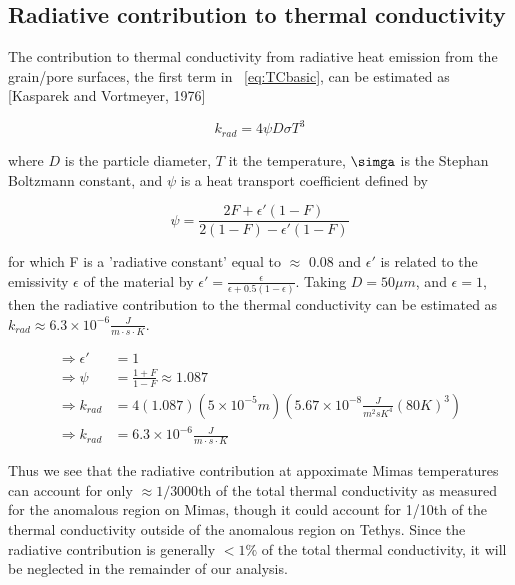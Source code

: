 \documentclass[11pt]{article} %
\begin{document}
\subsection{Radiative contribution to thermal conductivity}
\label{sec:krad}

	The contribution to thermal conductivity from radiative heat emission from the grain/pore surfaces, the first term in ~\ref{eq:TCbasic}, can be estimated as [Kasparek and Vortmeyer, 1976]

	\begin{equation}
	k_{rad} = 4 \psi D \sigma T^{3}
	\end{equation}
	
	where $D$ is the particle diameter, $T$ it the temperature, $\simga$ is the Stephan Boltzmann constant, and $\psi$ is a heat transport coefficient defined by
	
	\begin{equation}
	\psi = \frac{2F + \epsilon'(1-F)}{2(1-F)-\epsilon'(1-F)}
	\end{equation}

	for which F is a 'radiative constant' equal to $\approx$ 0.08 and $\epsilon'$ is related to the emissivity $\epsilon$ of the material by $\epsilon' = \frac{\epsilon}{\epsilon +0.5(1-\epsilon)}$. Taking $D = 50 \mu m$, and $\epsilon = 1$, then the radiative contribution to the thermal conductivity can be estimated as $k_{rad} \approx 6.3\times10^{-6} \frac{J}{m \cdot s \cdot K}$.
	
	\begin{equation}
	\begin{split}
	\Rightarrow \epsilon' &= 1 \\
	\Rightarrow \psi &= \frac{1+F}{1-F} \approx 1.087 \\
	\Rightarrow k_{rad} &= 4 (1.087)(5\times10^{-5} m)(5.67\times10^{-8} \frac{J}{m^{2} s K^{4}}(80 K)^{3}) \\
	\Rightarrow k_{rad} &= 6.3\times10^{-6} \frac{J}{m \cdot s \cdot K}
	\end{split}
	\end{equation}

	Thus we see that the radiative contribution at appoximate Mimas temperatures can account for only $\approx 1/3000$th of the total thermal conductivity as measured for the anomalous region on Mimas, though it could account for 1/10th of the thermal conductivity outside of the anomalous region on Tethys. Since the radiative contribution is generally $<1\%$  of the total thermal conductivity, it will be neglected in the remainder of our analysis.
\end{document}
